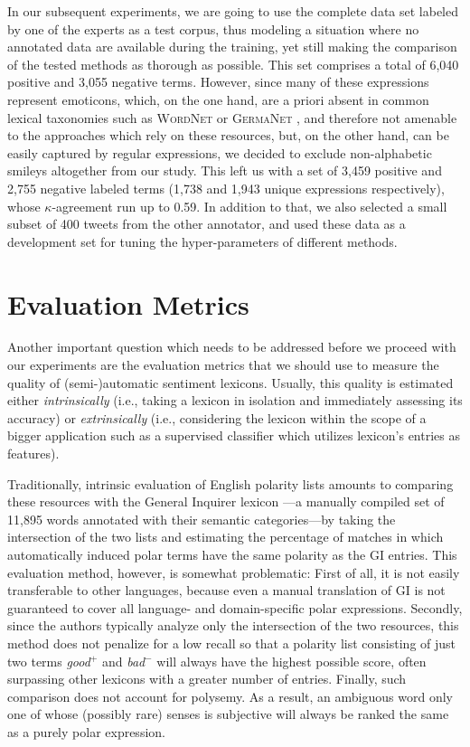 In our subsequent experiments, we are going to use the complete data
set labeled by one of the experts as a test corpus, thus modeling a
situation where no annotated data are available during the training,
yet still making the comparison of the tested methods as thorough as
possible.  This set comprises a total of 6,040 positive and 3,055
negative terms.  However, since many of these expressions represent
emoticons, which, on the one hand, are a priori absent in common
lexical taxonomies such as \textsc{WordNet} \cite{Miller:95,Miller:07}
or \textsc{GermaNet} \cite{Hamp:97}, and therefore not amenable to the
approaches which rely on these resources, but, on the other hand, can
be easily captured by regular expressions, we decided to exclude
non-alphabetic smileys altogether from our study.  This left us with a
set of 3,459 positive and 2,755 negative labeled terms (1,738 and
1,943 unique expressions respectively), whose $\kappa$-agreement run
up to 0.59.  In addition to that, we also selected a small subset of
400 tweets from the other annotator, and used these data as a
development set for tuning the hyper-parameters of different methods.

\section{Evaluation Metrics}\label{sec:snt-lex:eval-metrics}

Another important question which needs to be addressed before we
proceed with our experiments are the evaluation metrics that we should
use to measure the quality of \mbox{(semi-)auto}\-ma\-tic sentiment
lexicons.  Usually, this quality is estimated either
\textit{intrinsically} (i.e., taking a lexicon in isolation and
immediately assessing its accuracy) or \textit{extrinsically} (i.e.,
considering the lexicon within the scope of a bigger application such
as a supervised classifier which utilizes lexicon's entries as
features).

Traditionally, intrinsic evaluation of English polarity lists amounts
to comparing these resources with the General Inquirer lexicon
\cite[GI; ][]{Stone:66}---a manually compiled set of 11,895 words
annotated with their semantic categories---by taking the intersection
of the two lists and estimating the percentage of matches in which
automatically induced polar terms have the same polarity as the GI
entries.  This evaluation method, however, is somewhat problematic:
First of all, it is not easily transferable to other languages,
because even a manual translation of GI is not guaranteed to cover all
language- and domain-specific polar expressions.  Secondly, since the
authors typically analyze only the intersection of the two resources,
this method does not penalize for a low recall so that a polarity list
consisting of just two terms \textit{good}$^+$ and \textit{bad}$^-$
will always have the highest possible score, often surpassing other
lexicons with a greater number of entries.  Finally, such comparison
does not account for polysemy.  As a result, an ambiguous word only
one of whose (possibly rare) senses is subjective will always be
ranked the same as a purely polar expression.

